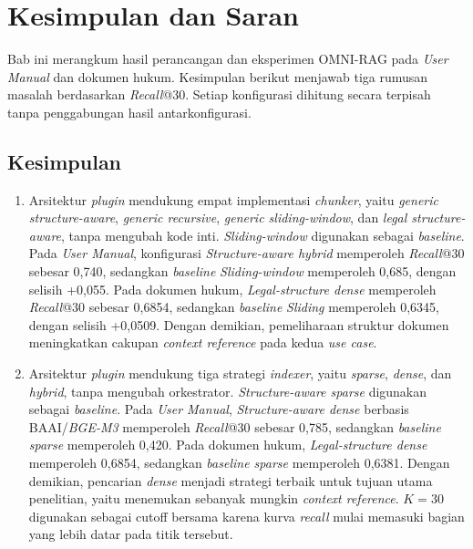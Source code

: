 \chapter[KESIMPULAN DAN SARAN]{Kesimpulan dan Saran}
\label{chap:kesimpulan-saran}

Bab ini merangkum hasil perancangan dan eksperimen OMNI-RAG pada \emph{User Manual} dan
dokumen hukum. Kesimpulan berikut menjawab tiga rumusan masalah berdasarkan \emph{Recall}@30.
Setiap konfigurasi dihitung secara terpisah tanpa penggabungan hasil antarkonfigurasi.

\section{Kesimpulan}
\label{sec:kesimpulan}

\begin{enumerate}
  \item Arsitektur \emph{plugin} mendukung empat implementasi
  \emph{chunker}, yaitu \emph{generic structure-aware}, \emph{generic recursive},
  \emph{generic sliding-window}, dan \emph{legal structure-aware}, tanpa mengubah kode inti.
  \emph{Sliding-window} digunakan sebagai \emph{baseline}. Pada \emph{User Manual}, konfigurasi
  \emph{Structure-aware hybrid} memperoleh \emph{Recall}@30 sebesar 0,740, sedangkan \emph{baseline}
  \emph{Sliding-window} memperoleh 0,685, dengan selisih +0,055. Pada dokumen hukum,
  \emph{Legal-structure dense} memperoleh \emph{Recall}@30 sebesar 0,6854, sedangkan \emph{baseline}
  \emph{Sliding} memperoleh 0,6345, dengan selisih +0,0509. Dengan demikian, pemeliharaan struktur dokumen meningkatkan cakupan
  \emph{context reference} pada kedua \emph{use case}.

  \item Arsitektur \emph{plugin} mendukung tiga strategi
  \emph{indexer}, yaitu \emph{sparse}, \emph{dense}, dan \emph{hybrid}, tanpa mengubah orkestrator.
  \emph{Structure-aware sparse} digunakan sebagai \emph{baseline}. Pada \emph{User Manual},
  \emph{Structure-aware dense} berbasis BAAI/\emph{BGE-M3} memperoleh \emph{Recall}@30 sebesar
  0,785, sedangkan \emph{baseline sparse} memperoleh 0,420. Pada dokumen hukum, \emph{Legal-structure
  dense} memperoleh 0,6854, sedangkan \emph{baseline sparse} memperoleh 0,6381. Dengan demikian,
  pencarian \emph{dense} menjadi strategi terbaik untuk tujuan utama penelitian, yaitu menemukan
  sebanyak mungkin \emph{context reference}. \(K = 30\) digunakan sebagai cutoff bersama karena
  kurva \emph{recall} mulai memasuki bagian yang lebih datar pada titik tersebut.


\end{enumerate}
